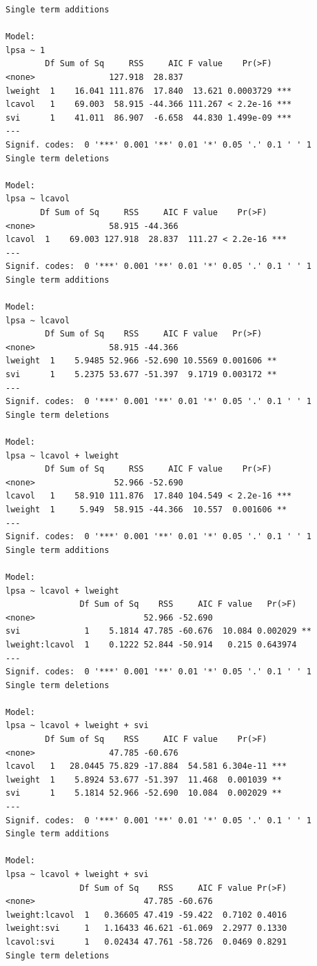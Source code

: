 \documentclass[
  dutch,
  letterpaper,
  12pt]{book}
\newcounter{none} %
\theoremstyle{definition}
\theoremstyle{definition}
\theoremstyle{definition}
\theoremstyle{remark}
\begin{document}
\begin{verbatim}
Single term additions

Model:
lpsa ~ 1
        Df Sum of Sq     RSS     AIC F value    Pr(>F)    
<none>               127.918  28.837                      
lweight  1    16.041 111.876  17.840  13.621 0.0003729 ***
lcavol   1    69.003  58.915 -44.366 111.267 < 2.2e-16 ***
svi      1    41.011  86.907  -6.658  44.830 1.499e-09 ***
---
Signif. codes:  0 '***' 0.001 '**' 0.01 '*' 0.05 '.' 0.1 ' ' 1
Single term deletions

Model:
lpsa ~ lcavol
       Df Sum of Sq     RSS     AIC F value    Pr(>F)    
<none>               58.915 -44.366                      
lcavol  1    69.003 127.918  28.837  111.27 < 2.2e-16 ***
---
Signif. codes:  0 '***' 0.001 '**' 0.01 '*' 0.05 '.' 0.1 ' ' 1
Single term additions

Model:
lpsa ~ lcavol
        Df Sum of Sq    RSS     AIC F value   Pr(>F)   
<none>               58.915 -44.366                    
lweight  1    5.9485 52.966 -52.690 10.5569 0.001606 **
svi      1    5.2375 53.677 -51.397  9.1719 0.003172 **
---
Signif. codes:  0 '***' 0.001 '**' 0.01 '*' 0.05 '.' 0.1 ' ' 1
Single term deletions

Model:
lpsa ~ lcavol + lweight
        Df Sum of Sq     RSS     AIC F value    Pr(>F)    
<none>                52.966 -52.690                      
lcavol   1    58.910 111.876  17.840 104.549 < 2.2e-16 ***
lweight  1     5.949  58.915 -44.366  10.557  0.001606 ** 
---
Signif. codes:  0 '***' 0.001 '**' 0.01 '*' 0.05 '.' 0.1 ' ' 1
Single term additions

Model:
lpsa ~ lcavol + lweight
               Df Sum of Sq    RSS     AIC F value   Pr(>F)   
<none>                      52.966 -52.690                    
svi             1    5.1814 47.785 -60.676  10.084 0.002029 **
lweight:lcavol  1    0.1222 52.844 -50.914   0.215 0.643974   
---
Signif. codes:  0 '***' 0.001 '**' 0.01 '*' 0.05 '.' 0.1 ' ' 1
Single term deletions

Model:
lpsa ~ lcavol + lweight + svi
        Df Sum of Sq    RSS     AIC F value    Pr(>F)    
<none>               47.785 -60.676                      
lcavol   1   28.0445 75.829 -17.884  54.581 6.304e-11 ***
lweight  1    5.8924 53.677 -51.397  11.468  0.001039 ** 
svi      1    5.1814 52.966 -52.690  10.084  0.002029 ** 
---
Signif. codes:  0 '***' 0.001 '**' 0.01 '*' 0.05 '.' 0.1 ' ' 1
Single term additions

Model:
lpsa ~ lcavol + lweight + svi
               Df Sum of Sq    RSS     AIC F value Pr(>F)
<none>                      47.785 -60.676               
lweight:lcavol  1   0.36605 47.419 -59.422  0.7102 0.4016
lweight:svi     1   1.16433 46.621 -61.069  2.2977 0.1330
lcavol:svi      1   0.02434 47.761 -58.726  0.0469 0.8291
Single term deletions


\end{verbatim}
\end{document}
